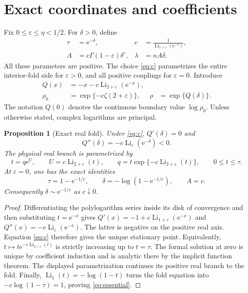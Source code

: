 \documentclass[11pt,a4paper]{article}
\numberwithin{equation}{section}
\newtheorem{proposition}[theorem]{Proposition}
\theoremstyle{definition}
\theoremstyle{remark}
\DeclareMathOperator{\Li}{Li}
\newcommand{\ep}{\varepsilon}\newcommand{\la}{\lambda}
\newcommand{\rhob}{\rho_0}\newcommand{\ee}{\mathrm e}
\begin{document}
\section{Exact coordinates and coefficients}
\label{sec:exact}
Fix \(0\le\ep\le\eta<1/2\). For \(\delta>0\), define
\begin{align}
 \tau&=\ee^{-\delta},&
 c&=\frac1{\Li_{1+\ep}(\ee^{-\delta})},\label{eq:c}\\
 A&=c\Gamma(1-\ep)\delta^\ep,&
 \la&=nA\delta.\label{eq:A}
\end{align}
All these parameters are positive. The choice \eqref{eq:c} parametrizes
the entire interior-fold side for \(\ep>0\), and all positive couplings
for \(\ep=0\). Introduce
\begin{align}
 Q(x)&=-x-c\Li_{2+\ep}(\ee^{-x}),\label{eq:Q}\\
 \rhob&=\exp\{-c\zeta(2+\ep)\},&
 \rho&=\exp\{Q(\delta)\}.\label{eq:rhos}
\end{align}
The notation \(Q(0)\) denotes the continuous boundary value \(\log\rhob\).
Unless otherwise stated, complex logarithms are principal.

\begin{proposition}[Exact real fold]\label{prop:fold}
Under \eqref{eq:c}, \(Q'(\delta)=0\) and
\[
 Q''(\delta)=-c\Li_\ep(\ee^{-\delta})<0.
\]
The physical real branch is parametrized by
\[
 t=q\ee^U,\qquad U=c\Li_{2+\ep}(t),\qquad
 q=t\exp\{-c\Li_{2+\ep}(t)\},\qquad 0\le t\le\tau.
\]
At \(\ep=0\), one has the exact identities
\begin{equation}\label{eq:essential}
 \tau=1-\ee^{-1/c},\qquad
 \delta=-\log(1-\ee^{-1/c}),\qquad A=c.
\end{equation}
Consequently \(\delta\sim\ee^{-1/c}\) as \(c\downarrow0\).
\end{proposition}
\begin{proof}
Differentiating the polylogarithm series inside its disk of convergence
and then substituting \(t=\ee^{-x}\) gives
\(Q'(x)=-1+c\Li_{1+\ep}(\ee^{-x})\) and
\(Q''(x)=-c\Li_\ep(\ee^{-x})\). The latter is negative on the positive
real axis. Equation \eqref{eq:c} therefore gives the unique stationary
point. Equivalently, \(t\mapsto t\ee^{-c\Li_{2+\ep}(t)}\) is strictly
increasing up to \(t=\tau\). The formal solution at zero is unique by
coefficient induction and is analytic there by the implicit function
theorem. The displayed parametrization continues its positive real
branch to the fold. Finally,
\(\Li_1(t)=-\log(1-t)\) turns the fold equation into
\(-c\log(1-\tau)=1\), proving \eqref{eq:essential}.
\end{proof}
\end{document}
